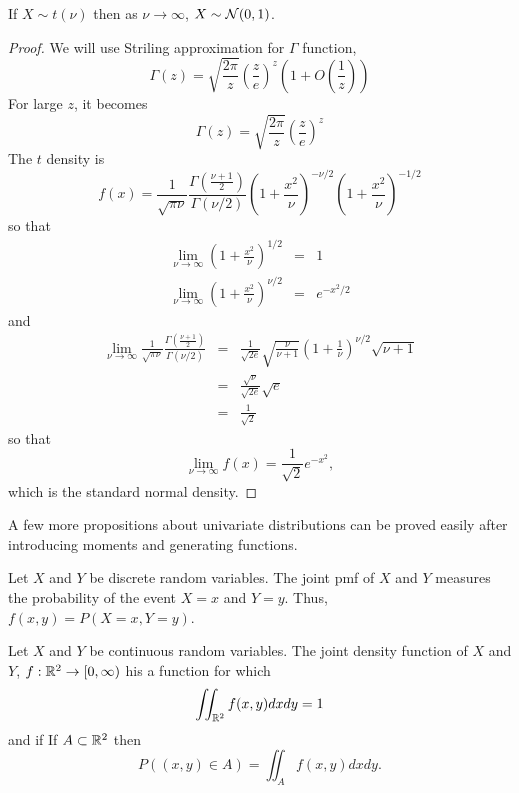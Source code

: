 \documentclass{article}
\begin{document}
\begin{prop}\label{c2p5}
If $X \sim t(\nu)$ then as $\nu \rightarrow \infty$, $X \sim \mathcal{N}(0, 1)$.
\end{prop}
\begin{proof}
We will use Striling approximation for $\Gamma$ function,
\begin{equation}\label{c2e24}
\Gamma(z) = \sqrt{\frac{2\pi}{z}}\left(\frac{z}{e}\right)^z
			\left(1 + O\left(\frac{1}{z}\right)\right)
\end{equation}
For large $z$, it becomes
\[
\Gamma(z) = \sqrt{\frac{2\pi}{z}}\left(\frac{z}{e}\right)^z
\]
The $t$ density is
\[
f(x) = \frac{1}{\sqrt{\pi\nu}}\frac{\Gamma(\frac{\nu+1}{2})}{\Gamma(\nu/2)}
	\left(1 + \frac{x^2}{\nu}\right)^{-\nu/2}\left(1 + \frac{x^2}{\nu}\right)^{-1/2}
\]
so that
\begin{eqnarray*}
\lim_{\nu\rightarrow\infty}\left(1 + \frac{x^2}{\nu}\right)^{1/2} &=& 1 \\
\lim_{\nu\rightarrow\infty}\left(1 + \frac{x^2}{\nu}\right)^{\nu/2} &=& e^{-x^2/2}
\end{eqnarray*}
and
\begin{eqnarray*}
\lim_{\nu\rightarrow\infty}\frac{1}{\sqrt{\pi\nu}}
\frac{\Gamma(\frac{\nu+1}{2})}{\Gamma(\nu/2)} &=& \frac{1}{\sqrt{2e}}
\sqrt{\frac{\nu}{\nu+1}}\left(1 + \frac{1}{\nu}\right)^{\nu/2}\sqrt{\nu+1} \\
 &=& \frac{\sqrt{\nu}}{\sqrt{2e}}\sqrt{e} \\
 &=& \frac{1}{\sqrt{2}}
\end{eqnarray*}
so that
\[
\lim_{\nu\rightarrow\infty}f(x) = \frac{1}{\sqrt{2}}e^{-x^2},
\]
which is the standard normal density.
\end{proof}

A few more propositions about univariate distributions can be proved easily after
introducing moments and generating functions.

\begin{defn}\label{c2d11}
Let $X$ and $Y$ be discrete random variables. The joint pmf of $X$ and $Y$ 
measures the probability of the event $X = x$ and $Y = y$. Thus,
$f(x, y) = P(X = x, Y = y)$.
\end{defn}

\begin{defn}\label{c2d12}
Let $X$ and $Y$ be continuous random variables. The joint density function of
$X$ and $Y$, $f: \mathbb{R}^2 \rightarrow [0, \infty)$ his a function for which
\[
\iint_{\mathbb{R}^2} f(x, y)dxdy = 1
\]
and if If $A \subset \mathbb{R}^2$ then
\[
P((x, y) \in A) = \iint_A f(x, y)dxdy.
\]
\end{defn}
\end{document}
